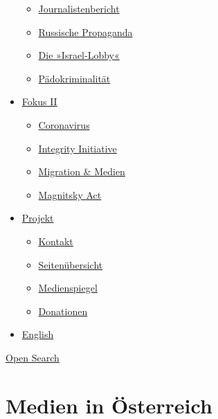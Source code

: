 \begin{itemize}
  \begin{itemize}
  \tightlist
  \item
    \href{https://swprs.org/bericht-eines-journalisten/}{Journalistenbericht}
  \item
    \href{https://swprs.org/russische-propaganda/}{Russische Propaganda}
  \item
    \href{https://swprs.org/die-israel-lobby-fakten-und-mythen/}{Die
    »Israel-Lobby«}
  \item
    \href{https://swprs.org/geopolitik-und-paedokriminalitaet/}{Pädokriminalität}
  \end{itemize}
\item
  \href{https://swprs.org/migration-und-medien/}{Fokus II}

  \begin{itemize}
  \tightlist
  \item
    \href{https://swprs.org/covid-19-hinweis-ii/}{Coronavirus}
  \item
    \href{https://swprs.org/die-integrity-initiative/}{Integrity
    Initiative}
  \item
    \href{https://swprs.org/migration-und-medien/}{Migration \& Medien}
  \item
    \href{https://swprs.org/der-fall-magnitsky/}{Magnitsky Act}
  \end{itemize}
\item
  \href{https://swprs.org/kontakt/}{Projekt}

  \begin{itemize}
  \tightlist
  \item
    \href{https://swprs.org/kontakt/}{Kontakt}
  \item
    \href{https://swprs.org/uebersicht/}{Seitenübersicht}
  \item
    \href{https://swprs.org/medienspiegel/}{Medienspiegel}
  \item
    \href{https://swprs.org/donationen/}{Donationen}
  \end{itemize}
\item
  \href{https://swprs.org/contact/}{English}
\end{itemize}

\protect\hyperlink{}{Open Search}

\hypertarget{medien-in-uxf6sterreich}{%
\section{Medien in Österreich}\label{medien-in-uxf6sterreich}}


